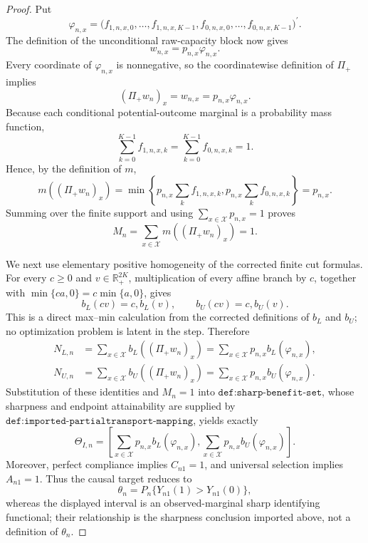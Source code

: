\documentclass{article}
\begin{document}
\begin{proof}
Put
\[
\varphi_{n,x}
=\bigl(f_{1,n,x,0},\ldots,f_{1,n,x,K-1},
f_{0,n,x,0},\ldots,f_{0,n,x,K-1}\bigr)^{\prime}.
\]
The definition of the unconditional raw-capacity block now gives
\[
w_{n,x}=p_{n,x}\varphi_{n,x}.
\]
Every coordinate of \(\varphi_{n,x}\) is nonnegative, so the coordinatewise definition of \(\Pi_+\) implies
\[
(\Pi_+w_n)_x=w_{n,x}=p_{n,x}\varphi_{n,x}.
\]
Because each conditional potential-outcome marginal is a probability mass function,
\[
\sum_{k=0}^{K-1}f_{1,n,x,k}
=\sum_{k=0}^{K-1}f_{0,n,x,k}=1.
\]
Hence, by the definition of \(m\),
\[
m((\Pi_+w_n)_x)
=\min\left\{p_{n,x}\sum_k f_{1,n,x,k},
p_{n,x}\sum_k f_{0,n,x,k}\right\}=p_{n,x}.
\]
Summing over the finite support and using \(\sum_{x\in\mathcal X}p_{n,x}=1\) proves
\[
M_n=\sum_{x\in\mathcal X}m((\Pi_+w_n)_x)=1.
\]

We next use elementary positive homogeneity of the corrected finite cut formulas.  For every \(c\ge0\) and \(v\in\mathbb R_+^{2K}\), multiplication of every affine branch by \(c\), together with
\(\min\{ca,0\}=c\min\{a,0\}\), gives
\[
b_L(cv)=c,b_L(v),
\qquad
b_U(cv)=c,b_U(v).
\]
This is a direct max--min calculation from the corrected definitions of \(b_L\) and \(b_U\); no optimization problem is latent in the step.  Therefore
\[
\begin{aligned}
N_{L,n}
&=\sum_{x\in\mathcal X}b_L((\Pi_+w_n)_x)
=\sum_{x\in\mathcal X}p_{n,x}b_L(\varphi_{n,x}),\\
N_{U,n}
&=\sum_{x\in\mathcal X}b_U((\Pi_+w_n)_x)
=\sum_{x\in\mathcal X}p_{n,x}b_U(\varphi_{n,x}).
\end{aligned}
\]
Substitution of these identities and \(M_n=1\) into \(\texttt{def:sharp-benefit-set}\), whose sharpness and endpoint attainability are supplied by \(\texttt{def:imported-partialtransport-mapping}\), yields exactly
\[
\Theta_{I,n}
=\left[
\sum_{x\in\mathcal X}p_{n,x}b_L(\varphi_{n,x}),
\sum_{x\in\mathcal X}p_{n,x}b_U(\varphi_{n,x})
\right].
\]
Moreover, perfect compliance implies \(C_{n1}=1\), and universal selection implies \(A_{n1}=1\).  Thus the causal target reduces to
\[
\theta_n=P_n\{Y_{n1}(1)>Y_{n1}(0)\},
\]
whereas the displayed interval is an observed-marginal sharp identifying functional; their relationship is the sharpness conclusion imported above, not a definition of \(\theta_n\).


\end{proof}
\end{document}
